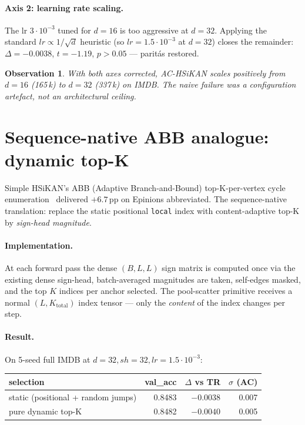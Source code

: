 \documentclass[10pt,a4paper]{article}
\newtheorem{observation}{Observation}
\begin{document}
\paragraph{Axis 2: learning rate scaling.}
The lr $3 \cdot 10^{-3}$ tuned for $d=16$ is too aggressive at $d=32$.
Applying the standard $lr \propto 1/\sqrt{d}$ heuristic (so
$lr = 1.5 \cdot 10^{-3}$ at $d=32$) closes the remainder:
$\Delta = -0.0038$, $t = -1.19$, $p > 0.05$ --- paritás restored.

\begin{observation}
With both axes corrected, AC-HSiKAN \emph{scales positively} from
$d=16$ (165\,k) to $d=32$ (337\,k) on IMDB. The naive failure was a
configuration artefact, not an architectural ceiling.
\end{observation}

\section{Sequence-native ABB analogue: dynamic top-K}

Simple HSiKAN's ABB (Adaptive Branch-and-Bound) top-K-per-vertex
cycle enumeration~\cite{hsikan-abb} delivered $+6.7$\,pp on Epinions
abbreviated. The sequence-native translation: replace the static
positional \texttt{local} index with content-adaptive top-K by
\emph{sign-head magnitude}.

\paragraph{Implementation.} At each forward pass the dense
$(B, L, L)$ sign matrix is computed once via the existing dense
sign-head, batch-averaged magnitudes are taken, self-edges masked, and
the top $K$ indices per anchor selected. The pool-scatter primitive
receives a normal $(L, K_{\text{total}})$ index tensor --- only the
\emph{content} of the index changes per step.

\paragraph{Result.} On 5-seed full IMDB at $d=32, sh=32, lr=1.5 \cdot 10^{-3}$:

\begin{center}
\begin{tabular}{lrrr}
\toprule
selection & val\_acc & $\Delta$ vs TR & $\sigma$ (AC) \\
\midrule
static (positional + random jumps) & 0.8483 & $-0.0038$ & 0.007 \\
pure dynamic top-K                  & 0.8482 & $-0.0040$ & 0.005 \\
\bottomrule
\end{tabular}
\end{center}
\end{document}
